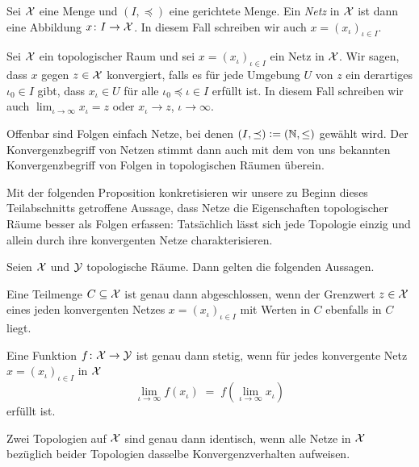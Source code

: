 \documentclass[../thesis/thesis.tex]{subfiles}
\begin{document}
	\begin{Definition}[Netz]
		\label{def:netz}
		Sei $\mathcal{X}$ eine Menge und $(I, \preceq)$ eine gerichtete Menge. Ein \emph{Netz} in $\mathcal{X}$ ist dann eine Abbildung $x \colon I \to \mathcal{X}$. In diesem
		Fall schreiben wir auch $x = (x_\iota)_{\iota \in I}$.
	\end{Definition}
	
	\begin{Definition}
		Sei $\mathcal{X}$ ein topologischer Raum und sei $x = (x_\iota)_{\iota \in I}$ ein Netz in $\mathcal{X}$. Wir sagen, dass $x$ gegen $z \in \mathcal{X}$ konvergiert, falls
		es für jede Umgebung $U$ von $z$ ein derartiges $\iota_0 \in I$ gibt, dass $x_\iota \in U$ für alle $\iota_0 \preceq \iota \in I$ erfüllt ist.
		In diesem Fall schreiben wir auch $\lim_{\iota \to \infty} x_\iota = z$ oder $x_\iota \to z$, $\iota \to \infty$.
	\end{Definition}
	
	\begin{Bemerkung}
		Offenbar sind Folgen einfach Netze, bei denen $(I, \preceq) \vcentcolon = (\mathbb{N}, \leq)$ gewählt wird. Der Konvergenzbegriff von Netzen stimmt
		dann auch mit dem von uns bekannten Konvergenzbegriff von Folgen in topologischen Räumen überein.
	\end{Bemerkung}
	
	Mit der folgenden Proposition konkretisieren wir unsere zu Beginn dieses Teilabschnitts getroffene Aussage, dass Netze die Eigenschaften topologischer Räume
	besser als Folgen erfassen: Tatsächlich lässt sich jede Topologie einzig und allein durch ihre konvergenten Netze charakterisieren.
	
	\begin{Proposition}
		\label{proposition:netz_konvergenz}
		Seien $\mathcal{X}$ und $\mathcal{Y}$ topologische Räume. Dann gelten die folgenden Aussagen.
		\begin{enumeratethm}
			\item Eine Teilmenge $C \subseteq \mathcal{X}$ ist genau dann abgeschlossen, wenn der Grenzwert $z \in \mathcal{X}$ eines jeden konvergenten Netzes 
			$x = (x_\iota)_{\iota \in I}$ mit Werten in $C$ ebenfalls in $C$ liegt.
			\item Eine Funktion $f \colon \mathcal{X} \to \mathcal{Y}$ ist genau dann stetig, wenn für jedes konvergente Netz $x = (x_\iota)_{\iota \in I}$ in $\mathcal{X}$ 
			\[ \lim_{\iota \to \infty} f(x_\iota) \; = \; f(\lim_{\iota \to \infty} x_\iota) \]
			erfüllt ist.
			\item Zwei Topologien auf $\mathcal{X}$ sind genau dann identisch, wenn alle Netze in $\mathcal{X}$ bezüglich beider Topologien dasselbe Konvergenzverhalten aufweisen.
		\end{enumeratethm}
	\end{Proposition}
	
\end{document}
